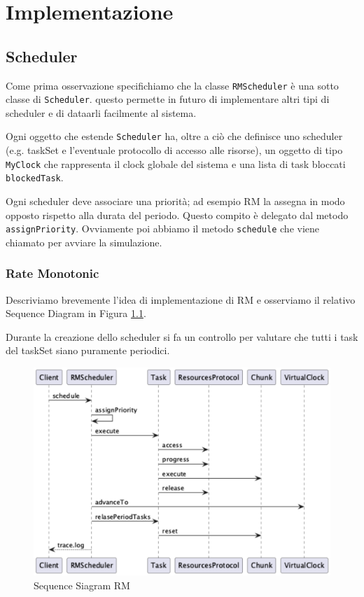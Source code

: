 \chapter{Implementazione}

\section{Scheduler}
Come prima osservazione specifichiamo che la classe \texttt{RMScheduler} è una sotto classe di \texttt{Scheduler}. questo permette in futuro di implementare altri tipi di scheduler e di dataarli facilmente al sistema.

Ogni oggetto che estende \texttt{Scheduler} ha, oltre a ciò che definisce uno scheduler (e.g. taskSet e l'eventuale protocollo di accesso alle risorse), un oggetto di tipo \texttt{MyClock} che rappresenta il clock globale del sistema e una lista di task bloccati \texttt{blockedTask}.

Ogni scheduler deve associare una priorità; ad esempio RM la assegna in modo opposto rispetto alla durata del periodo. Questo compito è delegato dal metodo \texttt{assignPriority}. Ovviamente poi abbiamo il metodo \texttt{schedule} che viene chiamato per avviare la simulazione.

\subsection{Rate Monotonic}
Descriviamo brevemente l'idea di implementazione di RM e osserviamo il relativo Sequence Diagram in Figura \ref{fig:sdRM}.

Durante la creazione dello scheduler si fa un controllo per valutare che tutti i task del taskSet siano puramente periodici.

\begin{figure}[htbp]
    \centering
    \includegraphics[width=1\textwidth]{immagini/sequence diagram RM.pdf}
    \caption{Sequence Siagram RM}
    \label{fig:sdRM}
\end{figure}

